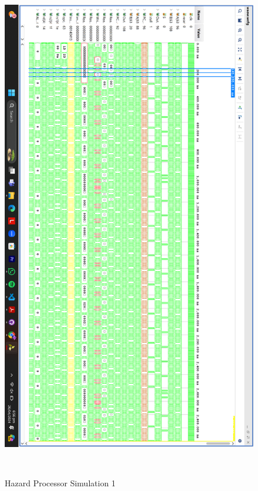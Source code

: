 \documentclass{report}
\begin{document}
\begin{figure}[h!]
    \centerline{\includegraphics[scale = 0.2]{Hazard 1.png}}
    \caption{Hazard Processor Simulation 1}

  \end{figure}
\end{document}
